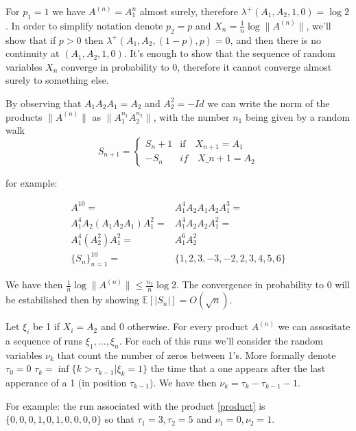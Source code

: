 \documentclass{article}
\begin{document}
For $p_1=1$ we have $A^{(n)}=A_1^n$ almost surely, therefore 
$\lambda^+(A_1,A_2,1,0)=\log 2$. In order to simplify notation denote $p_2=p$ and $X_n=\frac{1}{n}\log \|A^{(n)}\|$, we'll show that if $p>0$
then $\lambda^+(A_1,A_2,(1-p),p)=0$, and then there is no continuity at 
$(A_1,A_2,1,0)$. It's enough to show that the sequence of random variables $X_n$
converge in probability to 0, therefore it cannot converge almost surely to something
else.

By observing that  $A_1 A_2 A_1= A_2$ and $A_2^2=-Id$ we can write the norm of the products 
$\|A^{(n)}\|$ as  $\|A_1^{n_1}A_2^{n_2}\|$, with the number  $n_1$ being 
given by a random walk
\[
S_{n+1}=\begin{cases}
    S_n+ 1 & \text{if}\quad X_{n+1}=A_1 \\
    -S_n & \text{}if\quad X\_{n+1}=A_2
\end{cases}
\]













for example:

\begin{align}
    A^{10}=& A_1^4 A_2 A_1 A_2 A_1^3=  \label{product}\\
    A_1^4 A_2 (A_1 A_2 A_1) A_1^2=& A_1^4 A_2 A_2 A_1^2=\\
    A_1^4 (A_2^2) A_1^2=& A_1^6 A_2^2  \\
    \{S_n\}_{n=1}^{10}=&\{1,2,3,-3,-2,2,3,4,5,6\}
\end{align}





We have then $\frac{1}{n}\log\|A^{(n)}\|\leq \frac{n_1}{n}\log 2$.
The convergence in probability to 0 will be estabilished then by showing
$\mathbb{E}[|S_n|]=O(\sqrt{n})$.

Let $\xi_i $ be 1 if $X_i=A_2$ and 0 otherwise. For every product 
$A^{(n)}$ we can assositate a sequence of runs $\xi_1,\ldots, \xi_n$. 
For each of this runs we'll consider the random variables $\nu_k$ that 
count the number of zeros between 1's. More formally denote $\tau_0=0$ 
$\tau_k=\inf\{k>\tau_{k-1}| \xi_k=1\}$ the time that a one appears after
the last apperance of a 1 (in position $\tau_{k-1}$). We have then 
$\nu_k=\tau_k-\tau_{k-1}-1$.

For example: the run associated with the product  \ref{product} is
$\{0,0,0,1,0,1,0,0,0,0\}$ so that $\tau_1=3,\tau_2=5$ and $\nu_1=0,\nu_2=1$.
\end{document}

